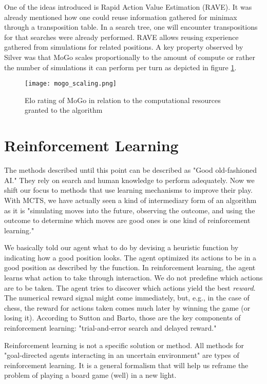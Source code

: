 One of the ideas introduced is Rapid Action Value Estimation (RAVE). It was already mentioned how one could reuse information gathered for minimax through a transposition table. In a search tree, one will encounter transpositions for that searches were already performed. RAVE allows reusing experience gathered from simulations for related positions. A key property observed by Silver was that MoGo scales proportionally to the amount of compute or rather the number of simulations it can perform per turn as depicted in figure \ref{mogo_scaling}.

\begin{figure}
    \centering
    \texttt{[image: mogo\_scaling.png]}
    \caption{Elo rating of MoGo in relation to the computational resources granted to the algorithm \cite[p. 1872]{gelly_monte-carlo_2011}}
    \label{mogo_scaling}
\end{figure}

\section{Reinforcement Learning}
The methods described until this point can be described as "Good old-fashioned AI." They rely on search and human knowledge to perform adequately. Now we shift our focus to methods that use learning mechanisms to improve their play. With MCTS, we have actually seen a kind of intermediary form of an algorithm as it is "simulating moves into the future, observing the outcome, and using the outcome to determine which moves are good ones is one kind of reinforcement learning." \cite[p. 331]{russell_artificial_2021}

We basically told our agent what to do by devising a heuristic function by indicating how a good position looks. The agent optimized its actions to be in a good position as described by the function. In reinforcement learning, the agent learns what action to take through interaction. We do not predefine which actions are to be taken. The agent tries to discover which actions yield the best \textit{reward}. The numerical reward signal might come immediately, but, e.g., in the case of chess, the reward for actions taken comes much later by winning the game (or losing it). According to Sutton and Barto, those are the key components of reinforcement learning: "trial-and-error search and delayed reward." \cite[p. 1]{sutton_reinforcement_2018}

Reinforcement learning is not a specific solution or method. All methods for "goal-directed agents interacting in an uncertain environment" \cite[p. 3]{sutton_reinforcement_2018} are types of reinforcement learning. It is a general formalism that will help us reframe the problem of playing a board game (well) in a new light.

